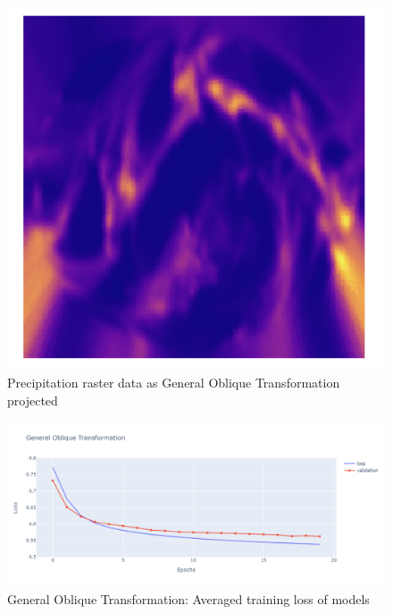 \begin{figure}[H]
\begin{minipage}{0.30\textwidth}
        \label{fig:ob_tran_proj}
    \end{minipage}\hfill
    \begin{minipage}{0.30\textwidth}
        \centering
        \includegraphics[width=0.9\linewidth]{figures/chapter-8/prect_got.png}
        \caption{Precipitation raster data as General Oblique Transformation projected}
        \label{fig:ob_tran_prect_raster}
    \end{minipage}\hfill
\end{figure}

\begin{figure}[H]
    \centering
    \includegraphics[width=1.0\linewidth]{figures/chapter-8/got_loss.png}
    \caption{General Oblique Transformation: Averaged training loss of models  }
    \label{fig:got_loss}
\end{figure}
